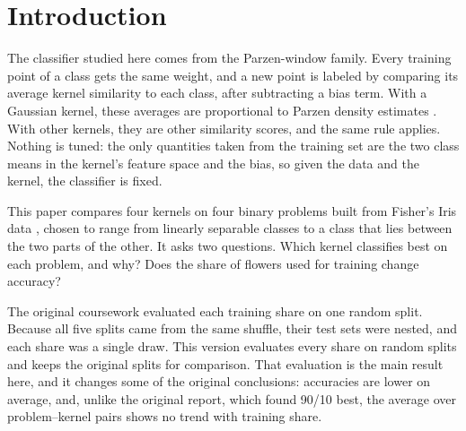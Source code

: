 \section{Introduction}

The classifier studied here comes from the Parzen-window family. Every training point of a class gets the same weight, and a new point is labeled by comparing its average kernel similarity to each class, after subtracting a bias term. With a Gaussian kernel, these averages are proportional to Parzen density estimates \cite{parzen1962}. With other kernels, they are other similarity scores, and the same rule applies. Nothing is tuned: the only quantities taken from the training set are the two class means in the kernel's feature space and the bias, so given the data and the kernel, the classifier is fixed.

This paper compares four kernels on four binary problems built from Fisher's Iris data \cite{fisher1936}, chosen to range from linearly separable classes to a class that lies between the two parts of the other. It asks two questions. Which kernel classifies best on each problem, and why? Does the share of flowers used for training change accuracy?

The original coursework evaluated each training share on one random split. Because all five splits came from the same shuffle, their test sets were nested, and each share was a single draw. This version evaluates every share on  random splits and keeps the original splits for comparison. That evaluation is the main result here, and it changes some of the original conclusions: accuracies are lower on average, and, unlike the original report, which found 90/10 best, the average over problem--kernel pairs shows no trend with training share.
